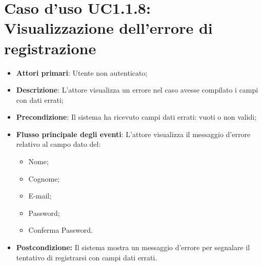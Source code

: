 		\section{Caso d'uso UC1.1.8: Visualizzazione dell'errore di registrazione}
		\begin{itemize}
			\item \textbf{Attori primari}: Utente non autenticato;
			\item \textbf{Descrizione}: L'attore visualizza un errore nel caso avesse compilato i campi con dati errati;
			\item \textbf{Precondizione}: Il sistema ha ricevuto campi dati errati: vuoti o non validi;
			\item \textbf{Flusso principale degli eventi}: L'attore visualizza il messaggio d'errore relativo al campo dato  del:
			\begin{itemize}
				\item Nome;
				\item Cognome;
				\item E-mail;
				\item Password;
				\item Conferma Password.
			\end{itemize}
			\item \textbf{Postcondizione:} Il sistema mostra un messaggio d'errore per segnalare il tentativo di registrarsi con campi dati errati.
		\end{itemize}
